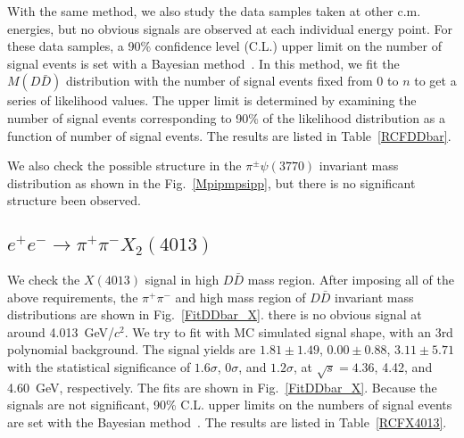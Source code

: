 \documentclass[aps,preprint,superscriptaddress,12pt,tightenlines]{revtex4}
\newcommand{\ddb}{D\bar{D}}
\begin{document}
With the same method, we also study the data samples taken at
other c.m. energies, but no obvious signals are observed at each
individual energy point. For these data samples, a 90\% confidence
level (C.L.) upper limit on the number of signal events is set
with a Bayesian method~\cite{upperlimit}. In this method, we fit
the $M(D\bar{D})$ distribution with the number of signal events
fixed from 0 to $n$ to get a series of likelihood values. The
upper limit is determined by examining the number of signal events
corresponding to 90\% of the likelihood distribution as a function
of number of signal events. The results are listed in
Table~\ref{RCFDDbar}.

We also check the possible structure in the $\pi^{\pm}\psi(3770)$ invariant
mass distribution as shown in the Fig.~\ref{Mpipmpsipp}, but there is no significant structure been observed.


\subsection{$e^{+}e^{-}\to \pi^{+}\pi^{-}X_{2}(4013)$}

We check the $X(4013)$ signal in high $\ddb$ mass region. After imposing
all of the above requirements, the $\pi^{+}\pi^{-}$ and high mass region of $\ddb$ invariant
mass distributions are shown in Fig.~\ref{FitDDbar_X}. there is no
obvious signal at around 4.013~GeV/$c^{2}$. We try
to fit with MC simulated signal shape, with an 3rd polynomial
background. The signal yields are $1.81\pm 1.49$, $0.00\pm 0.88$,
$3.11\pm 5.71$ with the statistical significance of $1.6\sigma$,
$0\sigma$, and $1.2\sigma$, at $\sqrt{s}= 4.36$, 4.42, and
4.60~GeV, respectively. The fits are shown in Fig.~\ref{FitDDbar_X}.
Because the signals are not significant, 90\% C.L. upper limits on
the numbers of signal events are set with the Bayesian
method~\cite{upperlimit}. The results are listed in
Table~\ref{RCFX4013}.
\end{document}
